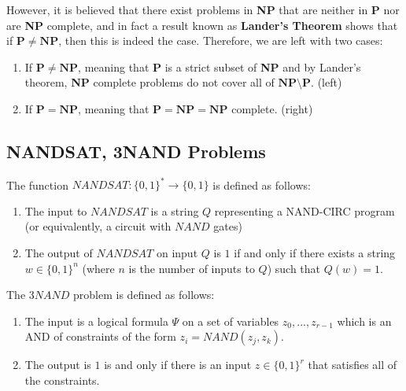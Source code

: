   However, it is believed that there exist problems in \textbf{NP} that are neither in \textbf{P} nor are \textbf{NP} complete, and in fact a result known as \textbf{Lander's Theorem} shows that if $\mathbf{P \neq NP}$, then this is indeed the case. Therefore, we are left with two cases:
  \begin{enumerate}
      \item If $\mathbf{P} \neq \mathbf{NP}$, meaning that \textbf{P} is a strict subset of \textbf{NP} and by Lander's theorem, \textbf{NP} complete problems do not cover all of $\mathbf{NP} \setminus \mathbf{P}$. (left)
      \item If $\mathbf{P} = \mathbf{NP}$, meaning that $\mathbf{P} = \mathbf{NP} = \mathbf{NP}$ complete. (right)
  \end{enumerate}
  \begin{center}
  \end{center}

\subsection{NANDSAT, 3NAND Problems}

  \begin{definition}
  The function $NANDSAT: \{0,1\}^* \longrightarrow \{0,1\}$ is defined as follows: 
  \begin{enumerate}
      \item The input to $NANDSAT$ is a string $Q$ representing a NAND-CIRC program (or equivalently, a circuit with $NAND$ gates)
      \item The output of $NANDSAT$ on input $Q$ is $1$ if and only if there exists a string $w \in \{0,1\}^n$ (where $n$ is the number of inputs to $Q$) such that $Q(w) = 1$. 
  \end{enumerate}
  \end{definition}

  \begin{definition}
  The $3NAND$ problem is defined as follows: 
  \begin{enumerate}
      \item The input is a logical formula $\Psi$ on a set of variables $z_0, ..., z_{r-1}$ which is an AND of constraints of the form $z_i = NAND(z_j, z_k)$. 
      \item The output is $1$ is and only if there is an input $z \in \{0, 1\}^r$ that satisfies all of the constraints. 
  \end{enumerate}
  \end{definition}

